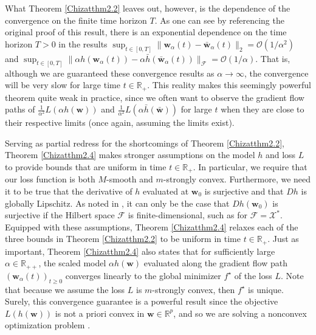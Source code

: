 \documentclass{article}
\begin{document}
What Theorem \ref{Chizatthm2.2} leaves out, however, is the dependence of the convergence on the finite time horizon $T$. As one can see by referencing the original proof of this result, there is an exponential dependence on the time horizon $T>0$ in the results $\sup_{t \in [0, T]} \| \boldsymbol{w}_{\alpha}(t) - \boldsymbol{\bar{w}}_{\alpha}(t) \|_2 = \mathcal{O}(1/\alpha^2)$ and $\sup_{t \in [0, T]} \| \alpha h(\boldsymbol{w}_{\alpha}(t)) - \alpha \bar{h}(\boldsymbol{\bar{w}}_{\alpha}(t)) \|_{\mathcal{F}} = \mathcal{O}(1/\alpha)$. That is, although we are guaranteed these convergence results as $\alpha \rightarrow \infty$, the convergence will be very slow for large time $t \in \mathbb{R}_+$. This reality makes this seemingly powerful theorem quite weak in practice, since we often want to observe the gradient flow paths of $\frac{1}{\alpha^2}L(\alpha h(\boldsymbol{w}))$ and $\frac{1}{\alpha^2}L(\alpha \bar{h}(\boldsymbol{\bar{w}}))$ for large $t$ when they are close to their respective limits (once again, assuming the limits exist).

Serving as partial redress for the shortcomings of Theorem \ref{Chizatthm2.2}, Theorem \ref{Chizatthm2.4} makes stronger assumptions on the model $h$ and loss $L$ to provide bounds that are uniform in time $t \in \mathbb{R}_+$. In particular, we require that our loss function is both $M$-smooth and $m$-strongly convex. Furthermore, we need it to be true that the derivative of $h$ evaluated at $\boldsymbol{w}_0$ is surjective and that $Dh$ is globally Lipschitz. As noted in \cite{chizat2018lazy}, it can only be the case that $Dh(\boldsymbol{w}_0)$ is surjective if the Hilbert space $\mathcal{F}$ is finite-dimensional, such as for $\mathcal{F} = \mathcal{X}^*$. Equipped with these assumptions, Theorem \ref{Chizatthm2.4} relaxes each of the three bounds in Theorem \ref{Chizatthm2.2} to be uniform in time $t \in \mathbb{R}_+$. Just as important, Theorem \ref{Chizatthm2.4} also states that for sufficiently large $\alpha \in \mathbb{R}_{++}$, the scaled model $\alpha h(\boldsymbol{w})$ evaluated along the gradient flow path $(\boldsymbol{w}_{\alpha}(t))_{t \geq 0}$ converges linearly to the global minimizer $f^{\star}$ of the loss $L$. Note that because we assume the loss $L$ is $m$-strongly convex, then $f^{\star}$ is unique. Surely, this convergence guarantee is a powerful result since the objective $L(h(\boldsymbol{w}))$ is not a priori convex in $\boldsymbol{w} \in \mathbb{R}^p$, and so we are solving a nonconvex optimization problem \cite{chizat2018lazy}.
\end{document}

